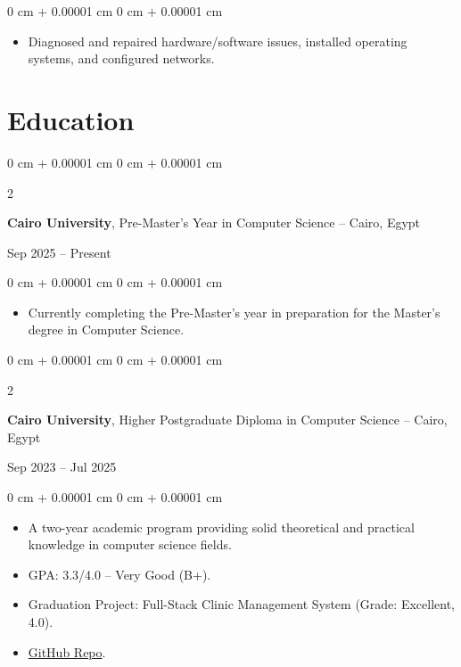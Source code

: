 \documentclass[10pt, letterpaper]{article}
\newenvironment{highlights}{
    \begin{itemize}[
        topsep=0.10 cm,
        parsep=0.10 cm,
        partopsep=0pt,
        itemsep=0pt,
        leftmargin=0 cm + 10pt
    ]
}{
    \end{itemize}
} %
\newenvironment{onecolentry}{
    \begin{adjustwidth}{
        0 cm + 0.00001 cm
    }{
        0 cm + 0.00001 cm
    }
}{
    \end{adjustwidth}
} %
\newenvironment{twocolentry}[2][]{
    \onecolentry
    \def\secondColumn{#2}
    \setcolumnwidth{\fill, 4.5 cm}
    \begin{paracol}{2}
}{
    \switchcolumn \raggedleft \secondColumn
    \end{paracol}
    \endonecolentry
} %
\begin{document}
    \vspace{0.10 cm}
    \begin{onecolentry}
        \begin{highlights}
            \item Diagnosed and repaired hardware/software issues, installed operating systems, and configured networks.
        \end{highlights}
    \end{onecolentry}

    \section{Education}
    
    \begin{twocolentry}{Sep 2025 -- Present}
        \textbf{Cairo University}, Pre-Master's Year in Computer Science -- Cairo, Egypt
    \end{twocolentry}
    
    \vspace{0.10 cm}
    \begin{onecolentry}
        \begin{highlights}
            \item Currently completing the Pre-Master’s year in preparation for the Master’s degree in Computer Science.
        \end{highlights}
    \end{onecolentry}
    
    \vspace{0.2 cm}
    
    \begin{twocolentry}{Sep 2023 -- Jul 2025}
        \textbf{Cairo University}, Higher Postgraduate Diploma in Computer Science -- Cairo, Egypt
    \end{twocolentry}
    
    \vspace{0.10 cm}
    \begin{onecolentry}
        \begin{highlights}
            \item A two-year academic program providing solid theoretical and practical knowledge in computer science fields.
            \item GPA: 3.3/4.0 -- Very Good (B+).
            \item Graduation Project: Full-Stack Clinic Management System (Grade: Excellent, 4.0).
            \item \href{https://github.com/M7-TROJAN/Medical-Clinic-Management-System}{GitHub Repo}.
        \end{highlights}
    \end{onecolentry}
    
\end{document}
